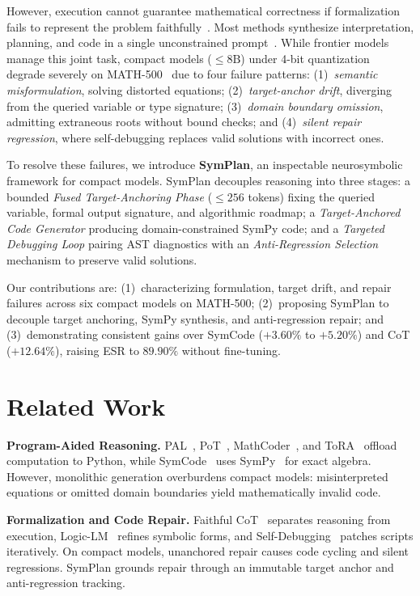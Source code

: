 \documentclass[runningheads]{llncs}
\begin{document}
However, execution cannot guarantee mathematical correctness if formalization fails to represent the problem faithfully~\cite{lyu2023faithful,pan2023logiclm}. Most methods synthesize interpretation, planning, and code in a single unconstrained prompt~\cite{gao2023pal,nezhad2025symcode}. While frontier models manage this joint task, compact models ($\le 8\text{B}$) under 4-bit quantization~\cite{dettmers2023qlora} degrade severely on MATH-500~\cite{lightman2024verify,hendrycks2021math} due to four failure patterns:
(1)~\textit{semantic misformulation}, solving distorted equations;
(2)~\textit{target-anchor drift}, diverging from the queried variable or type signature;
(3)~\textit{domain boundary omission}, admitting extraneous roots without bound checks; and
(4)~\textit{silent repair regression}, where self-debugging replaces valid solutions with incorrect ones.

To resolve these failures, we introduce \textbf{SymPlan}, an inspectable neurosymbolic framework for compact models. SymPlan decouples reasoning into three stages: a bounded \textit{Fused Target-Anchoring Phase} ($\le 256$ tokens) fixing the queried variable, formal output signature, and algorithmic roadmap; a \textit{Target-Anchored Code Generator} producing domain-constrained SymPy code; and a \textit{Targeted Debugging Loop} pairing AST diagnostics with an \textit{Anti-Regression Selection} mechanism to preserve valid solutions.

Our contributions are:
(1)~characterizing formulation, target drift, and repair failures across six compact models on MATH-500;
(2)~proposing SymPlan to decouple target anchoring, SymPy synthesis, and anti-regression repair; and
(3)~demonstrating consistent gains over SymCode ($+3.60\%$ to $+5.20\%$) and CoT ($+12.64\%$), raising ESR to $89.90\%$ without fine-tuning.

\section{Related Work}

\textbf{Program-Aided Reasoning.} PAL~\cite{gao2023pal}, PoT~\cite{chen2022pot}, MathCoder~\cite{wang2024mathcoder}, and ToRA~\cite{gou2024tora} offload computation to Python, while SymCode~\cite{nezhad2025symcode} uses SymPy~\cite{meurer2017sympy} for exact algebra. However, monolithic generation overburdens compact models: misinterpreted equations or omitted domain boundaries yield mathematically invalid code.

\textbf{Formalization and Code Repair.} Faithful CoT~\cite{lyu2023faithful} separates reasoning from execution, Logic-LM~\cite{pan2023logiclm} refines symbolic forms, and Self-Debugging~\cite{chen2024selfdebug} patches scripts iteratively. On compact models, unanchored repair causes code cycling and silent regressions. SymPlan grounds repair through an immutable target anchor and anti-regression tracking.
\end{document}

